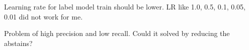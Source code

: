 \documentclass[10.7pt,]{article}
\begin{document}
Learning rate for label model train should be lower. LR like 1.0, 0.5, 0.1, 0.05, 0.01 did not work for me.

Problem of high precision and low recall. Could it solved by reducing the abstains?
%
%
%


\end{document}
